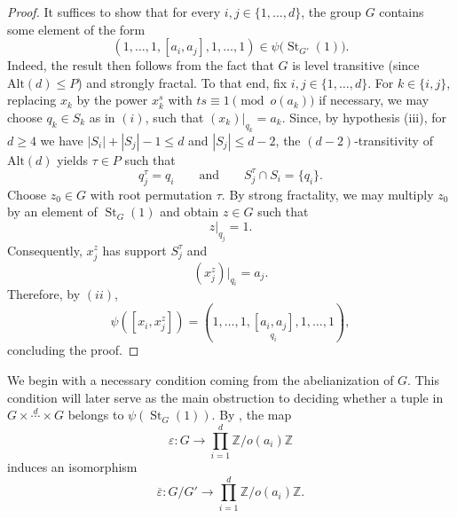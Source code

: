 \documentclass[11pt,leqno]{amsart}
\theoremstyle{plain}
\DeclareMathOperator{\St}{St}
\newcommand{\alt}{\mathrm{Alt}}
\numberwithin{equation}{section}
\begin{document}
\begin{proof}
	It suffices to show that for every $i,j\in \{1,\ldots,d\}$, the group $G$ contains some element of the form 
	\[
	(1,\ldots,1,[a_i,a_j],1,\ldots,1)
	\in \psi\bigl(\St_{G'}(1)\bigr).
	\]
    Indeed, the result then  follows from the fact that $G$ is level transitive  (since $\alt(d)\leq P$) and strongly fractal.
	To that end,  fix $i,j\in \{1,\ldots,d\}$. For $k\in \{i,j\}$, replacing $x_k$ by the power $x_k^{s}$ with $ts\equiv 1\pmod{o(a_k)}$ if necessary, we may choose
	$q_k\in S_k$ as in $(i)$, such that $(x_k)|_{q_k}=a_k$. Since, by hypothesis (iii), for $d\geq 4$ we have $|S_i|+|S_j|-1\leq d$ and $|S_j|\leq d-2$, the $(d-2)$-transitivity of $\alt(d)$ yields $\tau\in P$ such that
	\[
	q_j^\tau=q_i
	\qquad\text{and}\qquad
	S_j^\tau\cap S_i=\{q_i\}.
	\]
	Choose $z_0\in G$ with root permutation $\tau$. By strong
	fractality, we may multiply $z_0$ by an element of
	$\St_G(1)$ and obtain $z\in G$ such that
	\[
	z|_{q_j}=1.
	\]
	Consequently, $x_j^z$ has support $S_j^\tau$ and
	\[
	(x_j^z)|_{q_i}=a_j.
	\]
	Therefore, by $(ii)$,
	\[
	\psi([x_i,x_j^z])=(1,\ldots,1, \underset{q_i}{[a_i,a_j]}, 1,\ldots,1),
	\]
	concluding the proof.
\end{proof}



We begin with a necessary condition coming from the abelianization of $G$. This condition will later serve as the main obstruction to deciding whether a tuple in $G\times \stackrel{d}{\cdots}\times G$ belongs to $\psi(\St_G(1))$.
By , the map
\[
\varepsilon:G\longrightarrow \prod_{i=1}^d \mathbb Z/o(a_i)\mathbb Z
\]
induces an isomorphism
\[
\overline{\varepsilon}:G/G'\longrightarrow
\prod_{i=1}^d \mathbb Z/o(a_i)\mathbb Z.
\]
\end{document}
